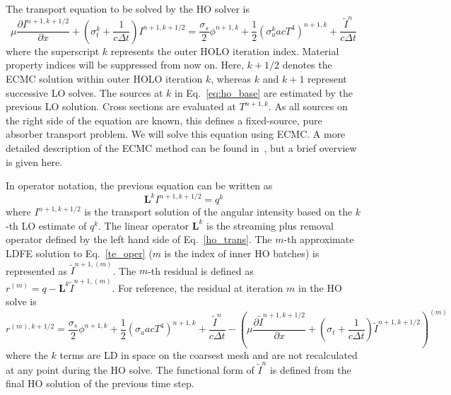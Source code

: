 \documentclass[12pt]{article}
\newcommand{\pderiv}[2]{\frac{\partial #1}{\partial #2}}
\newcommand{\B}[1]{\ensuremath{\mathbf{#1}}}
\begin{document}
\begin{center}
The transport equation to be solved by the HO solver is
\begin{equation}\label{eq:ho_base}
\mu \pderiv{I^{n+1,k+1/2}}{x} + \left(\sigma_t^k + \frac{1}{c \Delta t }\right)
I^{n+1,k+1/2}
= \frac{\sigma_s}{2} \phi^{n+1,k} +\frac{1}{2} \left(\sigma_a^k a c T^4
\right)^{n+1,k} + \frac{\tilde I^n}{c\Delta t} 
\end{equation}
where the superscript $k$ represents the outer HOLO iteration index.  Material property indices will be
suppressed from now on.  Here, $k+1/2$ denotes the
ECMC solution within outer HOLO iteration $k$, whereas $k$ and $k+1$ represent successive LO
solves. The sources at $k$ in Eq.~\eqref{eq:ho_base} are estimated by the previous LO solution. Cross sections are
evaluated at $T^{n+1,k}$.  As all sources on the right side of the equation are known,
this defines a fixed-source, pure absorber transport problem.  We will solve
this equation using ECMC.  A more detailed description of the
ECMC method can be found in~\cite{jake}, but a brief overview is given here.

 In operator notation, the previous equation can be written as
\begin{equation}\label{te_oper}
\B L^k I^{n+1,k+1/2}  = q^{k}
\end{equation}
where $I^{n+1,k+1/2}$ is the transport solution of the angular intensity based on the
$k$-th LO estimate of $q^k$.
The linear operator $\B L^k$ is the streaming plus
removal operator defined by the left hand
side of Eq.~\eqref{ho_trans}.
The $m$-th approximate LDFE solution to Eq.~\eqref{te_oper} ($m$ is the index of inner HO
batches) is represented as
$\tilde{I}^{n+1,(m)}$.    
The $m$-th residual is defined as $r^{(m)} = q - \B L^k\tilde{I}^{n+1,(m)}.$ 
For reference, the residual at iteration $m$ in the HO solve
is
\begin{equation}\label{eq:resid}
r^{(m),k+1/2} = \frac{\sigma_s}{2} \phi^{n+1,k} +\frac{1}{2} \left(\sigma_a a c T^4
\right)^{n+1,k} + \frac{\tilde{I}^n}{c \Delta t } -
\left(\mu \pderiv{\tilde{I}^{n+1,k+1/2}}{x} +
\left(\sigma_t + \frac{1}{c \Delta t }\right) \tilde{I}^{n+1,k+1/2}\right)^{(m)}
\end{equation}
where the $k$ terms are LD in space on the coarsest mesh and are not recalculated at any point during
the HO solve. The functional form of $\tilde{I}^n$ is defined from the final HO
solution of the previous time step.  


\end{center}
\end{document}
